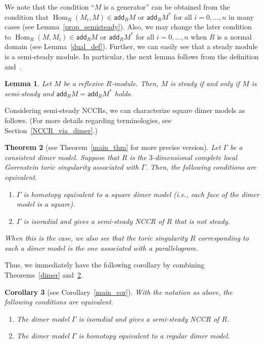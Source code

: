 \documentclass[11pt]{amsart}
\newtheorem{theo}{Theorem}[section]
\newtheorem{lemm}[theo]{Lemma}
\newtheorem{coro}[theo]{Corollary}
\theoremstyle{definition}
\DeclareMathOperator{\Hom}{Hom}
\newcommand{\add}{\mathsf{add}}
\newcommand*{\MK}{\mkern 2mu}
\begin{document}
We note that the condition ``$M$ is a generator'' can be obtained from the condition that $\Hom_R(M_i,M)\in\add_RM$ or $\add_RM^*$ for all $i=0,\dots,n$ in many cases (see Lemma~\ref{prop_semisteady}). Also, we may change the later condition to $\Hom_R(M,M_i)\in\add_RM$ or $\add_RM^*$ for all $i=0,\dots,n$ when $R$ is a normal domain (see Lemma~\ref{dual_def}). Further, we can easily see that a steady module is a semi-steady module. In particular, the next lemma follows from the definition and~\cite[Lemma~2.5$\MK$(b)]{IN}.

\begin{lemm}\label{semisteady_iff_steady}
Let $M$ be a reflexive $R$-module. Then, $M$ is steady if and only if $M$ is semi-steady and $\add_RM=\add_RM^*$ holds.
\end{lemm}

Considering semi-steady NCCRs, we can characterize square dimer models as follows. (For more details regarding terminologies, see Section~\ref{NCCR_via_dimer}.)

\begin{theo}[{see Theorem~\ref{main_thm} for more precise version}]\label{main_intro}
Let $\Gamma$ be a consistent dimer model. Suppose that $R$ is the $3$-dimensional complete local Gorenstein toric singularity associated with $\Gamma$. Then, the following conditions are equivalent.
\begin{enumerate}%
\item $\Gamma$ is homotopy equivalent to a square dimer model (i.e., each face of the dimer model is a square).
\item $\Gamma$ is isoradial and gives a semi-steady NCCR of $R$ that is not steady.
\end{enumerate}
When this is the case, we also see that the toric singularity $R$ corresponding to such a dimer model is the one associated with a parallelogram.
\end{theo}

Thus, we immediately have the following corollary by combining Theorems~\ref{dimer} and~\ref{main_intro}.

\begin{coro}[{see Corollary~\ref{main_cor}}]\label{main_cor_intro}
With the notation as above, the following conditions are equivalent.
\begin{enumerate}%
\item The dimer model $\Gamma$ is isoradial and gives a semi-steady NCCR of $R$.
\item The dimer model $\Gamma$ is homotopy equivalent to a regular dimer model.
\end{enumerate}
\end{coro}
\end{document}
